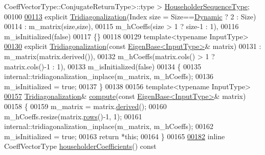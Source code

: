 \begin{DoxyCode}
{       CoeffVectorType::ConjugateReturnType>::type}
      > \hyperlink{group___eigenvalues___module_af322315c8bea9990152c9d09bfa2a69f}{HouseholderSequenceType};
00100 
\hyperlink{group___eigenvalues___module_a9ea2e6154bf35494ee68e037f0867cbd}{00113}     \textcolor{keyword}{explicit} \hyperlink{group___eigenvalues___module_a9ea2e6154bf35494ee68e037f0867cbd}{Tridiagonalization}(Index size = Size==\hyperlink{namespace_eigen_ad81fa7195215a0ce30017dfac309f0b2}{Dynamic} ? 2 : Size)
00114       : m\_matrix(size,size),
00115         m\_hCoeffs(size > 1 ? size-1 : 1),
00116         m\_isInitialized(false)
00117     \{\}
00118 
00129     \textcolor{keyword}{template}<\textcolor{keyword}{typename} InputType>
\hyperlink{group___eigenvalues___module_a05406b7df9a92fdcba72d31443f67a98}{00130}     \textcolor{keyword}{explicit} \hyperlink{group___eigenvalues___module_a05406b7df9a92fdcba72d31443f67a98}{Tridiagonalization}(\textcolor{keyword}{const} \hyperlink{group___core___module_struct_eigen_1_1_eigen_base}{EigenBase<InputType>}& matrix)
00131       : m\_matrix(matrix.derived()),
00132         m\_hCoeffs(matrix.cols() > 1 ? matrix.cols()-1 : 1),
00133         m\_isInitialized(false)
00134     \{
00135       internal::tridiagonalization\_inplace(m\_matrix, m\_hCoeffs);
00136       m\_isInitialized = \textcolor{keyword}{true};
00137     \}
00138 
00156     \textcolor{keyword}{template}<\textcolor{keyword}{typename} InputType>
\hyperlink{group___eigenvalues___module_acd288abb081d3b40b87e4b98cd8f6ee9}{00157}     \hyperlink{group___eigenvalues___module_class_eigen_1_1_tridiagonalization}{Tridiagonalization}& \hyperlink{group___eigenvalues___module_acd288abb081d3b40b87e4b98cd8f6ee9}{compute}(\textcolor{keyword}{const} 
      \hyperlink{group___core___module_struct_eigen_1_1_eigen_base}{EigenBase<InputType>}& matrix)
00158     \{
00159       m\_matrix = matrix.\hyperlink{group___core___module_a324b16961a11d2ecfd2d1b7dd7946545}{derived}();
00160       m\_hCoeffs.resize(matrix.\hyperlink{group___core___module_a8141320ba8df384426c298b32b000d8e}{rows}()-1, 1);
00161       internal::tridiagonalization\_inplace(m\_matrix, m\_hCoeffs);
00162       m\_isInitialized = \textcolor{keyword}{true};
00163       \textcolor{keywordflow}{return} *\textcolor{keyword}{this};
00164     \}
00165 
\hyperlink{group___eigenvalues___module_ac95b4e43dcf6c3c5074b8bea4fc67887}{00182}     \textcolor{keyword}{inline} CoeffVectorType \hyperlink{group___eigenvalues___module_ac95b4e43dcf6c3c5074b8bea4fc67887}{householderCoefficients}()\textcolor{keyword}{ const}

\end{DoxyCode}
